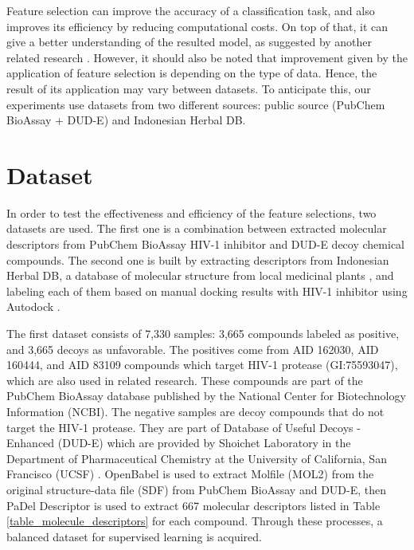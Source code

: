 \documentclass[conference]{IEEEtran}
\begin{document}
Feature selection can improve the accuracy of a classification task, and also improves its efficiency by reducing computational costs. On top of that, it can give a better understanding of the resulted model, as suggested by another related research \cite{janecek2008relationship}. However, it should also be noted that improvement given by the application of feature selection is depending on the type of data. Hence, the result of its application may vary between datasets\cite{janecek2008relationship}. To anticipate this, our experiments use datasets from two different sources: public source (PubChem BioAssay + DUD-E) and Indonesian Herbal DB.

\section{Dataset} \label{Dataset}

In order to test the effectiveness and efficiency of the feature selections, two datasets are used. The first one is a combination between extracted molecular descriptors from PubChem BioAssay HIV-1 inhibitor \cite{bioassay2014update} and DUD-E decoy chemical compounds\cite{mysinger2012directory}. The second one is built by extracting descriptors from Indonesian Herbal DB, a database of molecular structure from local medicinal plants \cite{yanuar2011medicinal}, and labeling each of them based on manual docking results with HIV-1 inhibitor using Autodock \cite{morris2009autodock4}.  

The first dataset consists of 7,330 samples: 3,665 compounds labeled as positive, and 3,665 decoys as unfavorable. The positives come from AID 162030, AID 160444, and AID 83109 compounds which target HIV-1 protease (GI:75593047), which are also used in related research\cite{yanuar2014virtual}. These compounds are part of the PubChem BioAssay database published by the National Center for Biotechnology Information (NCBI). The negative samples are decoy compounds that do not target the HIV-1 protease. They are part of Database of Useful Decoys - Enhanced (DUD-E) which are provided by Shoichet Laboratory in the Department of Pharmaceutical Chemistry at the University of California, San Francisco (UCSF) \cite{mysinger2012directory}. OpenBabel\cite{o2011open} is used to extract Molfile (MOL2) from the original structure-data file (SDF) from PubChem BioAssay and DUD-E, then PaDel Descriptor\cite{yap2011padel} is used to extract 667 molecular descriptors listed in Table \ref{table_molecule_descriptors} for each compound. Through these processes, a balanced dataset for supervised learning is acquired.
\end{document}
